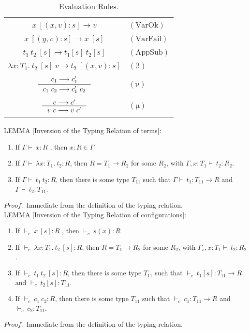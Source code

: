 \documentclass {article}
\newcommand\rulename[1]{\mathrm{(#1)}}
\newcommand{\tto}{\longrightarrow}
\newcommand{\appD}{t_1 \ t_2}
\newcommand{\absD}{\lambda x:T_1. \ t_2}
\newcommand{\confx}[1]{#1 \ [(x,v):s]}
\newcommand{\confy}[1]{#1 \ [(y,v):s]}
\newcommand{\env}{{\Gamma \vdash \ }}
\newcommand{\envE}{{\Gamma , x:T_1 \vdash \ }}
\newcommand{\envEC}{{\Gamma_s , x:T_1 \vdash \ }}
\newcommand{\tyC}{{\vdash_c \ }}
\begin{document}
\begin{table}
\begin{center}
\begin{tabular}{|c l|}
\hline
&\\
$\confx {x} \tto v$&$\rulename{VarOk}  $\\
&\\
$\confy {x} \tto x \ [s]$&$\rulename{VarFail}  $\\
&\\
$\appD \ [s] \tto t_1 [s] \ t_2 [s]$&$\rulename{AppSub} $\\
&\\
$\absD \ [s] \ v \tto \confx{t_2}  $&$\rulename{\beta}  $\\
&\\
$\inference {c_1 \tto c_1'}{c_1 \ c_2 \tto c_1' \ c_2} $&$\rulename{\nu}  $\\
&\\
$ \inference {c \tto c'}{v  \ c \tto v \ c'}$&$\rulename{\mu}  $\\
&\\
\hline
\end{tabular}
\caption{Evaluation Rules.}
\label{tabla:sencilla}
\end{center}
\end{table}
LEMMA [Inversion of the Typing Relation of terms]:
\begin{enumerate}
\item If $\env x : R$ , then $x : R \in \Gamma$
\item If $\env \absD : R$, then $R = T_1 \to R_2$ for some $R_2$, with $\envE t_2 : R_2$.
\item If $\env t_1 \ t_2 : R$, then there is some type $T_{11}$ such that $\env t_1 : T_{11} \to R$ and $\env t_2 : T_{11}$.
\end{enumerate}
$Proof:$ Immediate from the definition of the typing relation.\ \\

LEMMA [Inversion of the Typing Relation of configurations]:
\begin{enumerate}
\item If $\tyC x \ [s] : R$ , then $\tyC s(x) : R$
\item If $\tyC \absD \ [s]: R$, then $R = T_1 \to R_2$ for some $R_2$, with $\envEC t_2 : R_2$.
\item If $\tyC  t_1 \ t_2\ [s] : R$, then there is some type $T_{11}$ such that $\tyC t_1 [s] : T_{11} \to R$ and $\tyC t_2 [s] : T_{11}$.
\item If $\tyC   c_1 \ c_2 : R$, then there is some type $T_{11}$ such that $\tyC c_1 : T_{11} \to R$ and $\tyC c_2: T_{11}$.
\end{enumerate}
$Proof:$ Immediate from the definition of the typing relation.\ \\
\end{document}
